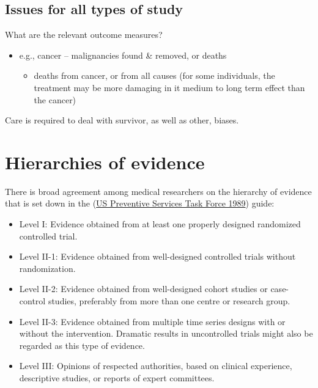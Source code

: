 \documentclass[
  10pt,
  b5paper]{book}
\providecommand{\tightlist}{%
  \setlength{\itemsep}{0pt}\setlength{\parskip}{0pt}}
\begin{document}
\hypertarget{issues-for-all-types-of-study}{%
\subsection*{Issues for all types of study}\label{issues-for-all-types-of-study}}

What are the relevant outcome measures?

\begin{itemize}
\tightlist
\item
  e.g., cancer -- malignancies found \& removed, or deaths

  \begin{itemize}
  \tightlist
  \item
    deaths from cancer, or from all causes (for some individuals,
    the treatment may be more damaging in it medium to long term
    effect than the cancer)
  \end{itemize}
\end{itemize}

Care is required to deal with survivor, as well as other, biases.

\hypertarget{hierarchies-of-evidence}{%
\section{Hierarchies of evidence}\label{hierarchies-of-evidence}}

There is broad agreement among medical researchers on the hierarchy of
evidence that is set down in the (\protect\hyperlink{ref-us1989guide}{US Preventive Services Task Force 1989}) guide:

\begin{itemize}
\tightlist
\item
  Level I: Evidence obtained from at least one properly designed
  randomized controlled trial.
\item
  Level II-1: Evidence obtained from well-designed controlled trials
  without randomization.
\item
  Level II-2: Evidence obtained from well-designed cohort studies or
  case-control studies, preferably from more than one centre or
  research group.
\item
  Level II-3: Evidence obtained from multiple time series designs with
  or without the intervention. Dramatic results in uncontrolled trials
  might also be regarded as this type of evidence.
\item
  Level III: Opinions of respected authorities, based on clinical
  experience, descriptive studies, or reports of expert committees.
\end{itemize}
\end{document}

